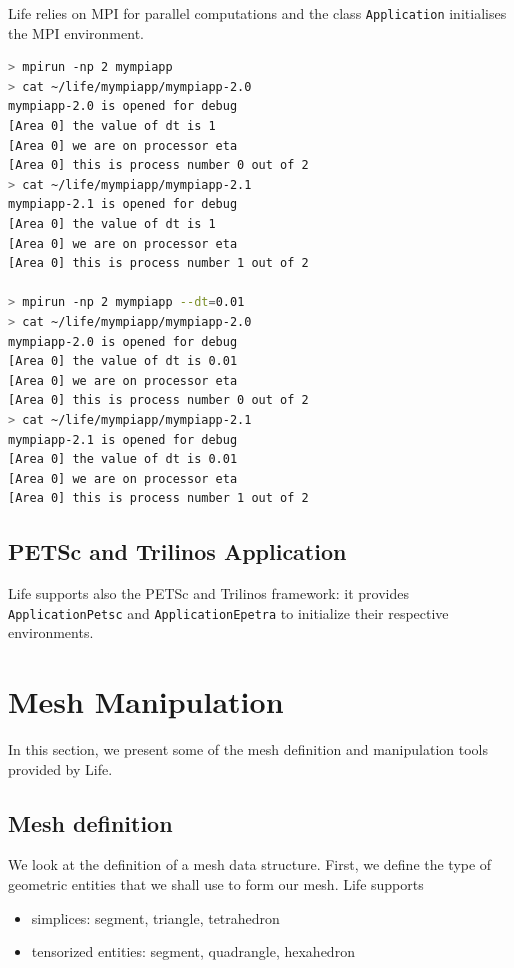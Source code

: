 \documentclass[11pt]{article}
\begin{document}
Life relies on MPI for parallel computations and the class
\lstinline!Application!  initialises the MPI environment.

\begin{lstlisting}[language=sh]
> mpirun -np 2 mympiapp
> cat ~/life/mympiapp/mympiapp-2.0
mympiapp-2.0 is opened for debug
[Area 0] the value of dt is 1
[Area 0] we are on processor eta
[Area 0] this is process number 0 out of 2
> cat ~/life/mympiapp/mympiapp-2.1
mympiapp-2.1 is opened for debug
[Area 0] the value of dt is 1
[Area 0] we are on processor eta
[Area 0] this is process number 1 out of 2

> mpirun -np 2 mympiapp --dt=0.01
> cat ~/life/mympiapp/mympiapp-2.0
mympiapp-2.0 is opened for debug
[Area 0] the value of dt is 0.01
[Area 0] we are on processor eta
[Area 0] this is process number 0 out of 2
> cat ~/life/mympiapp/mympiapp-2.1
mympiapp-2.1 is opened for debug
[Area 0] the value of dt is 0.01
[Area 0] we are on processor eta
[Area 0] this is process number 1 out of 2
\end{lstlisting}

\subsection{PETSc and Trilinos Application}

Life supports also the PETSc and Trilinos framework: it provides
\lstinline!ApplicationPetsc! and \lstinline!ApplicationEpetra! to
initialize their respective environments.

\section{Mesh Manipulation}

In this section, we present some of the mesh definition and
manipulation tools provided by Life.

\subsection{Mesh definition}

We look at the definition of a mesh data structure. First, we define
the type of geometric entities that we shall use to form our mesh. Life supports
\begin{itemize}
\item simplices: segment, triangle, tetrahedron
\item tensorized entities: segment, quadrangle, hexahedron
\end{itemize}
\end{document}
